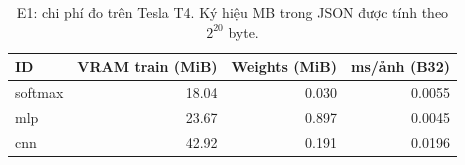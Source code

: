 \begin{table}[htbp]
\centering\small
\caption{E1: chi phí đo trên Tesla T4. Ký hiệu MB trong JSON được tính theo $2^{20}$ byte.}\label{tab:costE1}
\begin{lrbox}{\reporttable}\begin{tabular}{lrrr}
\toprule
ID & VRAM train (MiB) & Weights (MiB) & ms/ảnh (B32) \\
\midrule
softmax & 18.04 & 0.030 & 0.0055 \\
mlp & 23.67 & 0.897 & 0.0045 \\
cnn & 42.92 & 0.191 & 0.0196 \\
\bottomrule
\end{tabular}\end{lrbox}
\ifdim\wd\reporttable>\linewidth\resizebox{\linewidth}{!}{\usebox{\reporttable}}\else\usebox{\reporttable}\fi
\end{table}
